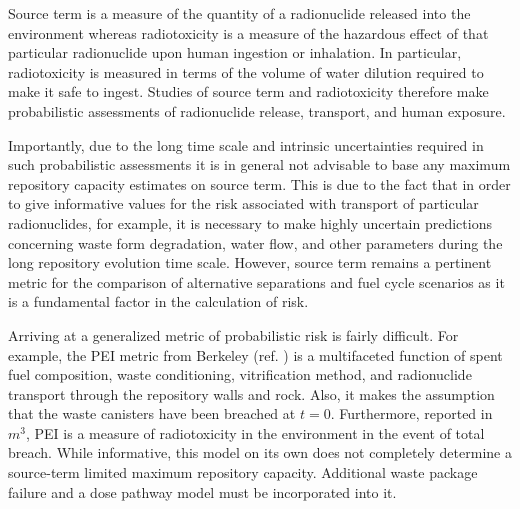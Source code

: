 Source term is a measure of the quantity of a radionuclide released into the 
environment whereas radiotoxicity is a measure of the hazardous effect of that 
particular radionuclide upon human ingestion or inhalation.  In particular, 
radiotoxicity is measured in terms of the volume of water dilution required to 
make it safe to ingest. Studies of source term and radiotoxicity therefore make 
probabilistic assessments of radionuclide release, transport, and human 
exposure.  

Importantly, due to the long time scale and intrinsic uncertainties required in 
such probabilistic assessments it is in general not advisable to base any 
maximum repository capacity estimates on source term. This is due to the fact 
that in order to give informative values for the risk associated with transport of 
particular radionuclides, for example, it is necessary to make highly uncertain  
predictions concerning waste form degradation, water flow, and other parameters 
during the long repository evolution time scale.  However, source term remains a 
pertinent metric for the comparison of alternative separations and fuel cycle
scenarios as it is a fundamental factor in the calculation of risk.

Arriving at a generalized metric of probabilistic risk is fairly difficult. For 
example, the \gls{PEI} metric from Berkeley (ref.  
\cite{bouvier_comparison_2007}) is a multifaceted function of spent fuel 
composition, waste conditioning, vitrification method, and radionuclide 
transport through the repository walls and rock.  Also, it makes the assumption 
that the waste canisters have been breached at $t=0$. Furthermore, reported in 
$m^3$, PEI is a measure of radiotoxicity in the environment in the event of 
total breach. While informative, this model on its own does not completely 
determine a source-term limited maximum repository capacity.  Additional waste 
package failure and a dose pathway model must be incorporated into it.

